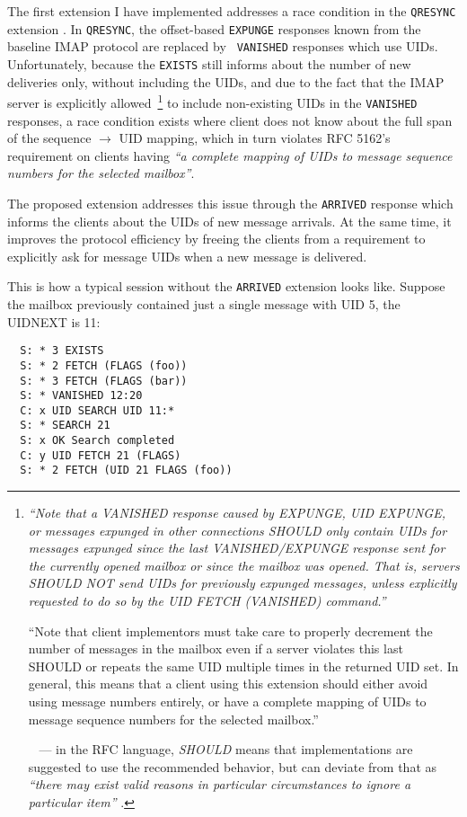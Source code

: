 \documentclass[trojita]{subfiles}
\begin{document}
The first extension I have implemented addresses a race condition in the {\tt QRESYNC} extension \cite{rfc5162}.  In
{\tt QRESYNC}, the offset-based {\tt EXPUNGE} responses known from the baseline IMAP protocol are replaced by {\tt
VANISHED} responses which use UIDs.  Unfortunately, because the {\tt EXISTS} still informs about the number of new
deliveries only, without including the UIDs, and due to the fact that the IMAP server is explicitly
allowed~\footnote{{\em``Note that a VANISHED response caused by EXPUNGE, UID EXPUNGE, or messages expunged in other
connections SHOULD only contain UIDs for messages expunged since the last VANISHED/EXPUNGE response sent for the
currently opened mailbox or since the mailbox was opened.  That is, servers SHOULD NOT send UIDs for previously expunged
messages, unless explicitly requested to do so by the UID FETCH (VANISHED) command.''

``Note that client implementors must take care to properly decrement the number of messages in the mailbox even if
a server violates this last SHOULD or repeats the same UID multiple times in the returned UID set.  In general, this
means that a client using this extension should either avoid using message numbers entirely, or have a complete mapping
of UIDs to message sequence numbers for the selected mailbox.''}~\cite[p. 12]{rfc5162} --- in the
RFC language, {\em SHOULD} means that implementations are suggested to use the recommended behavior, but can deviate
from that as {\em ``there may exist valid reasons in particular circumstances to ignore a particular item''}
\cite{rfc2092}.} to include non-existing UIDs in the {\tt VANISHED} responses, a race condition exists where client does
not know about the full span of the sequence $\rightarrow$ UID mapping, which in turn violates RFC 5162's requirement
on clients having {\em ``a complete mapping of UIDs to message sequence numbers for the selected mailbox''}.

The proposed extension addresses this issue through the {\tt ARRIVED} response which informs the clients about the UIDs
of new message arrivals.  At the same time, it improves the protocol efficiency by freeing the clients from a
requirement to explicitly ask for message UIDs when a new message is delivered.

This is how a typical session without the {\tt ARRIVED} extension looks like.  Suppose the mailbox previously contained
just a single message with UID 5, the UIDNEXT is 11:

\begin{verbatim}
  S: * 3 EXISTS
  S: * 2 FETCH (FLAGS (foo))
  S: * 3 FETCH (FLAGS (bar))
  S: * VANISHED 12:20
  C: x UID SEARCH UID 11:*
  S: * SEARCH 21
  S: x OK Search completed
  C: y UID FETCH 21 (FLAGS)
  S: * 2 FETCH (UID 21 FLAGS (foo))
\end{verbatim}
\end{document}
